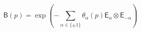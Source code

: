 \begin{equation}
\mathsf{B}(p)=\exp \left( -\sum_{\alpha \in \{\pm1\} } \theta_{\alpha}(p)
\mathsf{E}_{\alpha} \otimes \mathsf{E}_{-\alpha} \right)
\end{equation}

